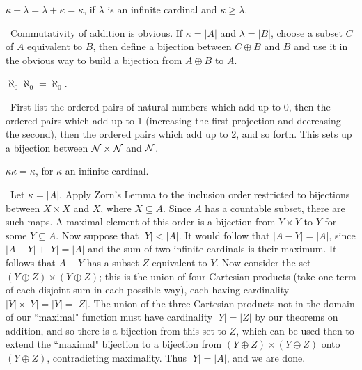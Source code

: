 \begin{thm}
 $\kappa + \lambda = \lambda + \kappa = \kappa$, if $\lambda$ is an
 infinite cardinal and $\kappa
 \geq \lambda$.
\end{thm}

\preuve\ Commutativity of addition is
obvious.  If $\kappa = |A|$ and $\lambda = |B|$,
choose a subset $C$ of $A$ equivalent to
$B$, then define a bijection 
between $C \oplus B$ and $B$ and use it in the obvious way to build a
bijection from $A \oplus B$ to $A$.
\finpreuve

\begin{thm}
 $\aleph_0\aleph_0 = \aleph_0$.
\end{thm}

\preuve\ First list the ordered pairs of
natural numbers which add up to
0, then the ordered pairs which add up to 1 (increasing the first
projection and decreasing the second), then the ordered pairs which
add up to 2, and so forth.  This sets up a bijection between ${\cal N}
\times {\cal N}$ and
${\cal N}$.
\finpreuve

\begin{thm}
 $\kappa\kappa = \kappa$, for $\kappa$ an infinite
 cardinal.
\end{thm}

\preuve\ Let $\kappa = |A|$.  Apply Zorn's Lemma to the
inclusion order 
restricted to bijections between $X \times X$ and $X$, where
$X \subseteq A$.  Since $A$ has a countable subset, there are
such maps.  A maximal element of this order is a bijection from $Y \times Y$ to
$Y$ for some $Y \subseteq A$.  Now suppose that $|Y| < |A|$.  It would follow
that $|A - Y| = |A|$, since $|A - Y| + |Y| = |A|$ and the sum of two
infinite cardinals is their 
maximum.  It follows that $A - Y$ has a subset $Z$ equivalent to $Y$.  Now consider the set $(Y \oplus Z) \times (Y \oplus
Z)$; this is the union of four Cartesian products
(take one term of each disjoint sum in each
possible way), each having cardinality $|Y| \times |Y| = |Y| = |Z|$.  The 
union of the three Cartesian products not in the domain of our
``maximal" function must have cardinality $|Y| = |Z|$ by our
theorems on addition, and so there is a bijection from this set to $Z$, which
can be used then to extend the ``maximal" bijection to a bijection from $(Y
\oplus Z) \times (Y \oplus Z)$ onto $(Y \oplus Z)$, contradicting maximality.
Thus $|Y| = |A|$, and we are done.
\finpreuve

